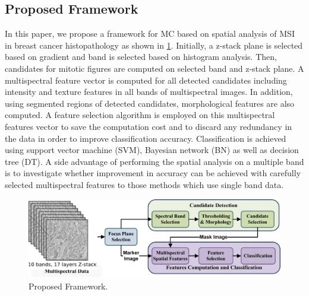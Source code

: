 \documentclass[10pt,twocolumn,letterpaper]{article}
\begin{document}
\subsection{Proposed Framework}
In this paper, we propose a framework for MC based on spatial analysis of MSI in breast cancer histopathology as shown in \ref{fig:framework}. Initially, a z-stack plane is selected based on gradient and band is selected based on histogram analysis. Then, candidates for mitotic figures  are computed on selected band and z-stack plane. A multispectral feature vector is computed for all detected candidates including intensity and texture features in all bands of multispectral images. In addition, using segmented regions of detected candidates, morphological features are also computed. A feature selection algorithm is employed on this multispectral features vector to save the computation cost and to discard any redundancy in the data in order to improve classification accuracy. Classification is achieved using support vector machine (SVM), Bayesian network (BN) as well as decision tree (DT). A side advantage of performing the spatial analysis on a multiple band is to investigate whether improvement in accuracy can be achieved with carefully selected multispectral features to those methods \cite{masood2009,wu2009,wu2012} which use single band data.
\begin{figure}
	\centering
	\includegraphics[width=\textwidth]{diagrams/framework.jpg}
	\caption{Proposed Framework.}
	\label{fig:framework}
\end{figure}
\end{document}
